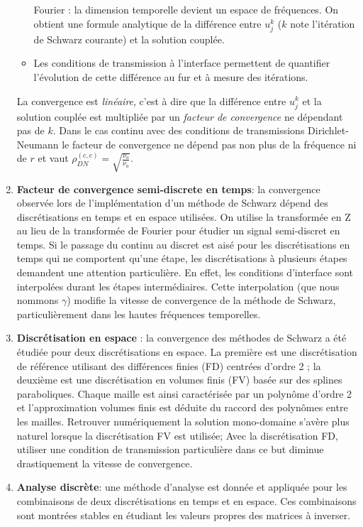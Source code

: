 \begin{enumerate}
\begin{itemize}
	Fourier : la dimension temporelle devient un espace
	de fréquences. On obtient une formule analytique de
	la différence entre $u_j^k$
	($k$ note l'itération de Schwarz courante)
	et la solution couplée.
\item Les conditions de transmission à l'interface permettent
	de quantifier l'évolution de cette différence au fur et
	à mesure des itérations.
\end{itemize}
 La convergence est \textit{linéaire},
 c'est à dire que la différence entre $u_j^k$ et la solution couplée
 est multipliée par un \textit{facteur de convergence} ne dépendant
 pas de $k$. Dans le cas continu avec des conditions
 de transmissions Dirichlet-Neumann le facteur de convergence ne
 dépend pas non plus de la fréquence ni de $r$ et vaut
 $\rho_{DN}^{(c,c)}=\sqrt{\frac{\nu_o}{\nu_a}}$.
\item \textbf{Facteur de convergence semi-discrete en temps}:
la convergence observée lors de l'implémentation d'un méthode
de Schwarz dépend des discrétisations en temps et en espace utilisées.
On utilise la transformée en Z au lieu de la transformée de Fourier
pour étudier un signal semi-discret en temps.
Si le passage du continu au discret est aisé pour les discrétisations
en temps qui ne comportent qu'une étape, les discrétisations
à plusieurs étapes demandent une attention particulière. En effet,
les conditions d'interface sont interpolées durant les étapes
intermédiaires. Cette interpolation (que nous nommons $\gamma$)
modifie la vitesse de convergence de la méthode de Schwarz,
particulièrement dans les hautes fréquences temporelles.
\item \textbf{Discrétisation en espace} :
la convergence des méthodes de Schwarz a été étudiée pour
deux discrétisations en espace. La première est une discrétisation
de référence utilisant des différences finies (FD)
centrées d'ordre 2 ;
la deuxième est une discrétisation en volumes finis (FV) basée sur
des splines paraboliques.
Chaque maille est ainsi caractérisée par un polynôme d'ordre 2
et l'approximation volumes finis est déduite du raccord des polynômes
entre les mailles.
Retrouver numériquement la solution mono-domaine s'avère plus
naturel lorsque la discrétisation FV est utilisée;
Avec la discrétisation FD, utiliser une condition de transmission
particulière dans ce but diminue
drastiquement la vitesse de convergence.
\item \textbf{Analyse discrète}:
une méthode d'analyse est donnée et appliquée pour les combinaisons
de deux discrétisations en temps et en espace. Ces combinaisons
sont montrées stables en étudiant les valeurs propres des
matrices à inverser.
\end{enumerate}
